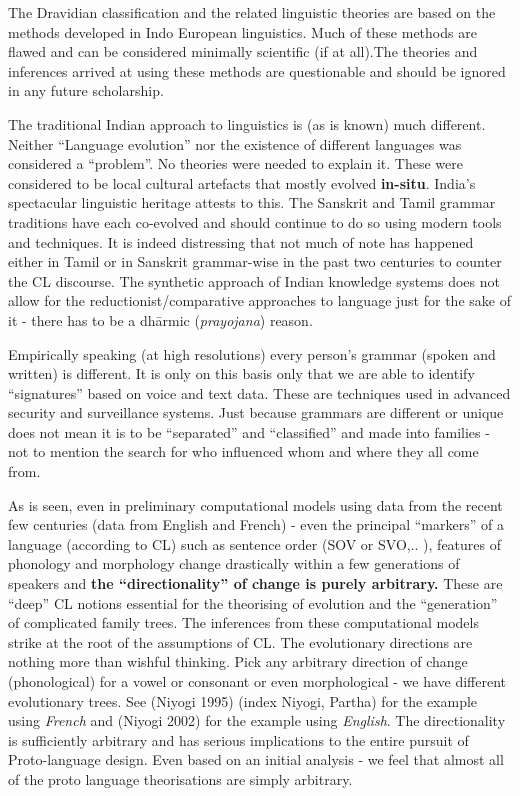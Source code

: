 The Dravidian classification and the related linguistic theories are based on the methods developed in Indo European linguistics. Much of these methods are flawed and can be considered minimally scientific (if at all).The theories and inferences arrived at using these methods are questionable and should be ignored in any future scholarship.

The traditional Indian approach to linguistics is (as is known) much different. Neither “Language evolution” nor the existence of different languages was considered a “problem”. No theories were needed to explain it. These were considered to be local cultural artefacts that mostly evolved \textbf{in-situ}. India’s spectacular linguistic heritage attests to this. The Sanskrit and Tamil grammar traditions have each co-evolved and should continue to do so using modern tools and techniques. It is indeed distressing that not much of note has happened either in Tamil or in Sanskrit grammar-wise in the past two centuries to counter the CL discourse. The synthetic approach of Indian knowledge systems does not allow for the reductionist/comparative approaches to language just for the sake of it - there has to be a dhārmic (\textit{prayojana}) reason.

Empirically speaking (at high resolutions) every person’s grammar (spoken and written) is different. It is only on this basis only that we are able to identify “signatures” based on voice and text data. These are techniques used in advanced security and surveillance systems. Just because grammars are different or unique does not mean it is to be “separated” and “classified” and made into families - not to mention the search for who influenced whom and where they all come from.

As is seen, even in preliminary computational models using data from the recent few centuries (data from English and French) - even the principal “markers” of a language (according to CL) such as sentence order (SOV or SVO,.. ), features of phonology and morphology change drastically within a few generations of speakers and \textbf{the “directionality” of change is purely arbitrary.} These are “deep” CL notions essential for the theorising of evolution and the “generation” of complicated family trees. The inferences from these computational models strike at the root of the assumptions of CL. The evolutionary directions are nothing more than wishful thinking. Pick any arbitrary direction of change (phonological) for a vowel or consonant or even morphological - we have different evolutionary trees. See (Niyogi 1995) (index Niyogi, Partha) for the example using \textit{French} and (Niyogi 2002) for the example using \textit{English}. The directionality is sufficiently arbitrary and has serious implications to the entire pursuit of Proto-language design. Even based on an initial analysis - we feel that almost all of the proto language theorisations are simply arbitrary.

